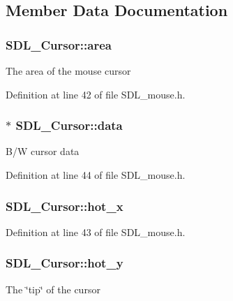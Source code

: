 \subsection{Member Data Documentation}
\hypertarget{struct_s_d_l___cursor_afefd14bbad7b59dbf22d63352ced7378}{}
\subsubsection[{area}]{ S\+D\+L\+\_\+\+Cursor\+::area}\label{struct_s_d_l___cursor_afefd14bbad7b59dbf22d63352ced7378}
The area of the mouse cursor 

Definition at line 42 of file S\+D\+L\+\_\+mouse.\+h.

\hypertarget{struct_s_d_l___cursor_ae7f8c81028205f9359f0171f2a82ec04}{}
\subsubsection[{data}]{$\ast$ S\+D\+L\+\_\+\+Cursor\+::data}\label{struct_s_d_l___cursor_ae7f8c81028205f9359f0171f2a82ec04}
B/\+W cursor data 

Definition at line 44 of file S\+D\+L\+\_\+mouse.\+h.

\hypertarget{struct_s_d_l___cursor_a9560ccf14c4b7eb5dd905c6af57ba3e1}{}
\subsubsection[{hot\+\_\+x}]{ S\+D\+L\+\_\+\+Cursor\+::hot\+\_\+x}\label{struct_s_d_l___cursor_a9560ccf14c4b7eb5dd905c6af57ba3e1}


Definition at line 43 of file S\+D\+L\+\_\+mouse.\+h.

\hypertarget{struct_s_d_l___cursor_a154ec5999705b912aa09b1f1bacb3275}{}
\subsubsection[{hot\+\_\+y}]{ S\+D\+L\+\_\+\+Cursor\+::hot\+\_\+y}\label{struct_s_d_l___cursor_a154ec5999705b912aa09b1f1bacb3275}
The \char`\"{}tip\char`\"{} of the cursor 

